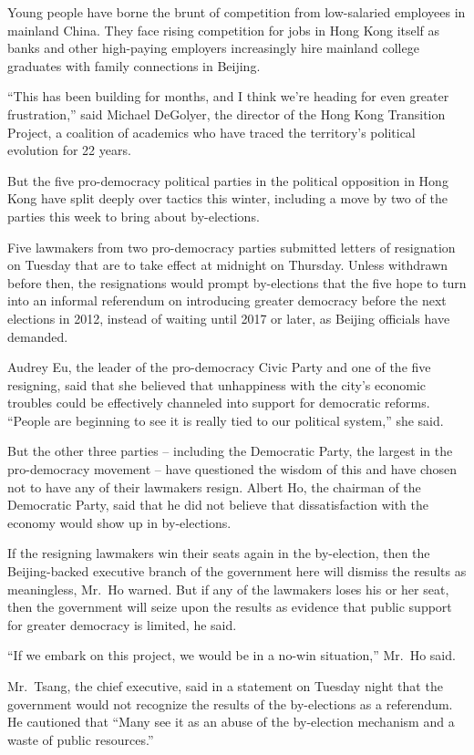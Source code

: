 ﻿\documentclass[12pt]{article}
\begin{document}
Young people have borne the brunt of competition from low-salaried employees in mainland China. They
face rising competition for jobs in Hong Kong itself as banks and other high-paying employers
increasingly hire mainland college graduates with family connections in Beijing.

``This has been building for months, and I think we're heading for even greater frustration,'' said
Michael DeGolyer, the director of the Hong Kong Transition Project, a coalition of academics who
have traced the territory's political evolution for 22 years.

But the five pro-democracy political parties in the political opposition in Hong Kong have split
deeply over tactics this winter, including a move by two of the parties this week to bring about
by-elections.

Five lawmakers from two pro-democracy parties submitted letters of resignation on Tuesday that are
to take effect at midnight on Thursday. Unless withdrawn before then, the resignations would prompt
by-elections that the five hope to turn into an informal referendum on introducing greater democracy
before the next elections in 2012, instead of waiting until 2017 or later, as Beijing officials have
demanded.

Audrey Eu, the leader of the pro-democracy Civic Party and one of the five resigning, said that she
believed that unhappiness with the city's economic troubles could be effectively channeled into
support for democratic reforms. ``People are beginning to see it is really tied to our political
system,'' she said.

But the other three parties -- including the Democratic Party, the largest in the pro-democracy
movement -- have questioned the wisdom of this and have chosen not to have any of their lawmakers
resign. Albert Ho, the chairman of the Democratic Party, said that he did not believe that
dissatisfaction with the economy would show up in by-elections.

If the resigning lawmakers win their seats again in the by-election, then the Beijing-backed
executive branch of the government here will dismiss the results as meaningless, Mr.~Ho warned. But
if any of the lawmakers loses his or her seat, then the government will seize upon the results as
evidence that public support for greater democracy is limited, he said.

``If we embark on this project, we would be in a no-win situation,'' Mr.~Ho said.

Mr.~Tsang, the chief executive, said in a statement on Tuesday night that the government would not
recognize the results of the by-elections as a referendum. He cautioned that ``Many see it as an
abuse of the by-election mechanism and a waste of public resources.''
\end{document}

